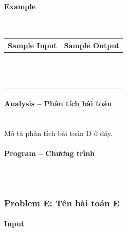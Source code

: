 \documentclass{article}
\begin{document}
\paragraph{Example}\mbox{} \\

\begin{table}[h]
    \centering
    \begin{tabular}{|l|r|}
        \hline
        \textbf{Sample Input} & \textbf{Sample Output} \\
        \hline
		&  \\ 
		&  \\ 
		&  \\ 
		&  \\ 
		&  \\
		&  \\ 
		&  \\ 
		&  \\ 
		&  \\ 
		&  \\ 
		&  \\ 
		&  \\
		&  \\ \hline
    \end{tabular}
\end{table}

\paragraph{Analysis -- Phân tích bài toán} \mbox{} \\

Mô tả phân tích bài toán D ở đây.

\paragraph{Program -- Chương trình} \mbox{} \\

\begin{lstlisting}

\end{lstlisting}

\subsubsection{Problem E: Tên bài toán E}


\paragraph{Input} \mbox{} \\
\end{document}
